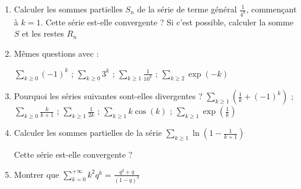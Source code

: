 \begin{frame}
\begin{miniexercice}
\begin{enumerate}
  
  \item Calculer les sommes partielles $S_n$ de la série de terme général 
  $\frac{1}{4^k}$, commençant à $k=1$. Cette série est-elle convergente ? 
  Si c'est possible, calculer la somme $S$ et les restes $R_n$
  
  \item Mêmes questions avec :
  
   $ \displaystyle\sum_{k\ge0} (-1)^k$ ; $ \displaystyle\sum_{k\ge0} 3^k$ ; $ \displaystyle\sum_{k\ge1} \frac{1}{10^k}$ ; $ \displaystyle\sum_{k\ge2} \exp(-k)$
  
 \item Pourquoi les séries suivantes sont-elles divergentes ?
  $ \displaystyle\sum_{k\ge1} \left( \frac1k + (-1)^k \right)$ ; $ \displaystyle\sum_{k\ge 0} \frac{k}{k+1}$ ; 
  $ \displaystyle\sum_{k\ge1} \frac{1}{2k}$ ;
  $ \displaystyle\sum _{k\ge1} k \cos(k)$ ; $ \displaystyle\sum_{k\ge1} \exp(\frac1k)$
    
   
  \item Calculer les sommes partielles de la série 
  $ \sum_{k\ge1} \ln\left( 1-\frac{1}{k+1} \right)$
  
  Cette série est-elle convergente ?
  
  \item Montrer que $\displaystyle \sum_{k=0}^{+\infty} k^2q^k = \frac{q^2+q}{(1-q)^3}$

\end{enumerate}
\end{miniexercice}
\end{frame}

